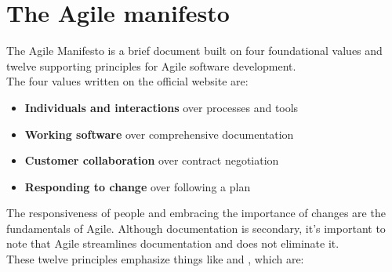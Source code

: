 \section{The Agile manifesto}
	The Agile Manifesto is a brief document built on four foundational values and twelve supporting principles for Agile software development\cite{agilemanifesto}.\\
	The four values written on the official website\cite{agile_official} are:
	\begin{itemize}
		\item \textbf{Individuals and interactions} over processes and tools
		\item \textbf{Working software} over comprehensive documentation
		\item \textbf{Customer collaboration} over contract negotiation
		\item \textbf{Responding to change} over following a plan
	\end{itemize}
	The responsiveness of people and embracing the importance of changes are the fundamentals of Agile.
	Although documentation is secondary, it's important to note that Agile streamlines documentation and does not eliminate it.\\
	These twelve principles emphasize things like  and , which are: 
